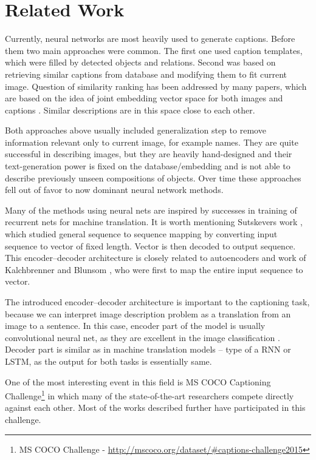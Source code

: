 	\section{Related Work}
	\label{sec:related}
	
Currently, neural networks are most heavily used to generate captions. Before them two main approaches were common. The first one used caption templates, which were filled by detected objects and relations. Second was based on retrieving similar captions from database and modifying them to fit current image. Question of similarity ranking has been addressed by many papers, which are based on the idea of joint embedding vector space for both images and captions \cite{DBLP:journals/corr/KarpathyF14}. Similar descriptions are in this space close to each other.

Both approaches above usually included generalization step to remove information relevant only to current image, for example names. They are quite successful in describing images, but they are heavily hand-designed and their text-generation power is fixed on the database/embedding and is not able to describe previously unseen compositions of objects. Over time these approaches fell out of favor to now dominant neural network methods.

Many of the methods using neural nets are inspired by successes in training of recurrent nets for machine translation. It is worth mentioning Sutskevers work \cite{DBLP:journals/corr/SutskeverVL14}, which studied general sequence to sequence mapping by converting input sequence to vector of fixed length. Vector is then decoded to output sequence. This encoder--decoder architecture is closely related to autoencoders and work of Kalchbrenner and Blunsom \cite{conf/emnlp/KalchbrennerB13}, who were first to map the entire input sequence to vector.

The introduced encoder--decoder architecture is important to the captioning task, because we can interpret image description problem as a translation from an image to a sentence. In this case, encoder part of the model is usually convolutional neural net, as they are excellent in the image classification \cite{DBLP:journals/corr/SzegedyLJSRAEVR14}. Decoder part is similar as in machine translation models -- type of a RNN or LSTM, as the output for both tasks is essentially same.

One of the most interesting event in this field is MS COCO Captioning Challenge\footnote{MS COCO Challenge - \url{http://mscoco.org/dataset/\#captions-challenge2015}} in which many of the state-of-the-art researchers compete directly against each other. Most of the works described further have participated in this challenge.

